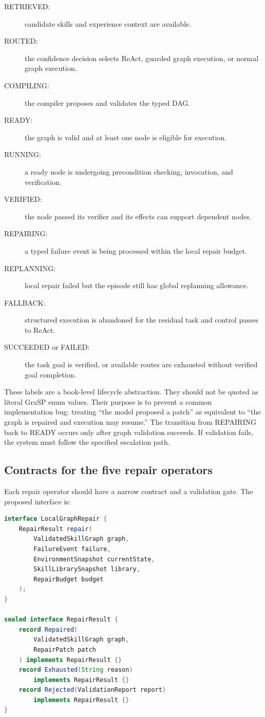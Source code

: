 \begin{description}
  \item[RETRIEVED:] candidate skills and experience context are available.
  \item[ROUTED:] the confidence decision selects ReAct, guarded graph execution, or normal graph execution.
  \item[COMPILING:] the compiler proposes and validates the typed DAG.
  \item[READY:] the graph is valid and at least one node is eligible for execution.
  \item[RUNNING:] a ready node is undergoing precondition checking, invocation, and verification.
  \item[VERIFIED:] the node passed its verifier and its effects can support dependent nodes.
  \item[REPAIRING:] a typed failure event is being processed within the local repair budget.
  \item[REPLANNING:] local repair failed but the episode still has global replanning allowance.
  \item[FALLBACK:] structured execution is abandoned for the residual task and control passes to ReAct.
  \item[SUCCEEDED or FAILED:] the task goal is verified, or available routes are exhausted without verified goal completion.
\end{description}

These labels are a book-level lifecycle abstraction. They should not be quoted as literal GraSP enum values. Their purpose is to prevent a common implementation bug: treating “the model proposed a patch” as equivalent to “the graph is repaired and execution may resume.” The transition from REPAIRING back to READY occurs only after graph validation succeeds. If validation fails, the system must follow the specified escalation path.\autocite{xia2026grasp}

\subsection{Contracts for the five repair operators}

Each repair operator should have a narrow contract and a validation gate. The proposed interface is:

\begin{lstlisting}[language=Java,caption={Book-created repair service contract}]
interface LocalGraphRepair {
    RepairResult repair(
        ValidatedSkillGraph graph,
        FailureEvent failure,
        EnvironmentSnapshot currentState,
        SkillLibrarySnapshot library,
        RepairBudget budget
    );
}

sealed interface RepairResult {
    record Repaired(
        ValidatedSkillGraph graph,
        RepairPatch patch
    ) implements RepairResult {}
    record Exhausted(String reason)
        implements RepairResult {}
    record Rejected(ValidationReport report)
        implements RepairResult {}
}
\end{lstlisting}

